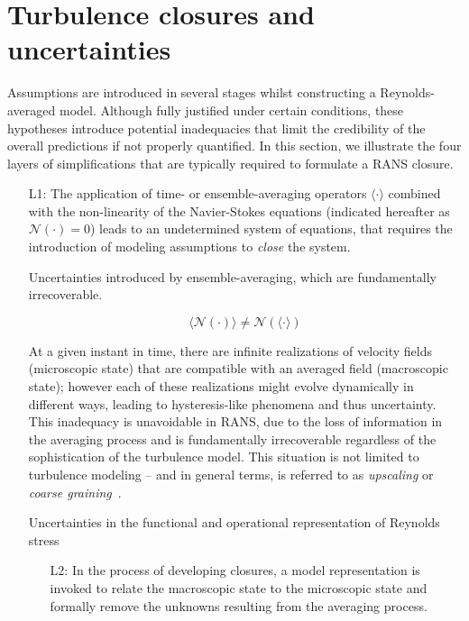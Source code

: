 \documentclass[a4paper]{ar-1col}
\begin{document}
\section{Turbulence closures  and uncertainties}
\label{sec:levels}
Assumptions are introduced in several stages 
whilst constructing a  Reynolds-averaged model. Although fully justified under certain conditions, these 
hypotheses introduce potential inadequacies that limit the credibility of the overall predictions if not
properly quantified. In this section, we illustrate the  four layers of simplifications that are typically required to 
formulate a RANS closure.


\begin{itemize}

\item[L1:]
The application of  time- or ensemble-averaging operators $\langle \cdot \rangle$ combined with the non-linearity of the Navier-Stokes equations (indicated hereafter as $\mathcal N(\cdot) = 0$)
leads to an undetermined system of equations, that requires the introduction of modeling assumptions to {\it close} the
system.  
\begin{marginnote}[]
 {Uncertainties introduced by ensemble-averaging, which are fundamentally irrecoverable.}
\end{marginnote}
\begin{equation}
\langle \mathcal N(\cdot) \rangle \ne \mathcal N( \langle \cdot \rangle )
\label{eq:L1a}
\end{equation}


At a given instant in time, there are infinite realizations of velocity fields (microscopic state)
that are compatible with an averaged field (macroscopic state); however each of these realizations might  evolve dynamically in different ways, leading
to hysteresis-like phenomena and thus uncertainty. This  inadequacy is unavoidable in RANS, due to the loss of information 
in the  averaging process and is fundamentally irrecoverable regardless of the sophistication of the turbulence model. This situation is not limited to turbulence modeling --  and in general terms, is referred to as {\it upscaling} or {\it coarse graining}~\citep{rudd1998coarse-grained}.

 
 \begin{marginnote}[]
 {Uncertainties in the functional and operational representation of Reynolds stress}
\end{marginnote}

 
\begin{itemize}
\item[L2:]
In the process of developing closures, a model representation is invoked to relate the macroscopic state to the microscopic state
and  formally remove the  unknowns resulting from the averaging process.  


\end{itemize}
\end{itemize}
\end{document}
